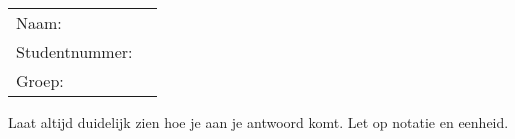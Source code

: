 \documentclass[a4paper,12pt]{exam}
\begin{document}
\setlength\extrarowheight{10pt}
\noindent
\begin{tabularx}{\linewidth}{@{}lX@{}}
Naam: & \hrulefill \\
Studentnummer: & \hrulefill \\
Groep: & \hrulefill
\end{tabularx}

\vspace{1.5em}
\noindent
Laat altijd duidelijk zien hoe je aan je antwoord komt. Let op notatie en eenheid.
\vspace{1em}


\newpage

\end{document}
